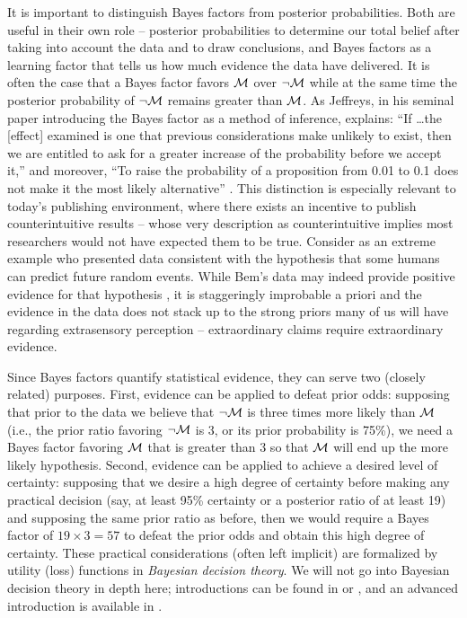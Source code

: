 It is important to distinguish Bayes factors from posterior probabilities. Both are useful in their own role -- posterior probabilities to determine our total belief after taking into account the data and to draw conclusions, and Bayes factors as a learning factor that tells us how much evidence the data have delivered. It is often the case that a Bayes factor favors ${\cal M}$ over $\neg{\cal M}$ while at the same time the posterior probability of $\neg{\cal M}$ remains greater than ${\cal M}$.  As Jeffreys, in his seminal paper introducing the Bayes factor as a method of inference, explains: ``If \dots  the [effect] examined is one that previous considerations make unlikely to exist, then we are entitled to ask for a greater increase of the probability before we accept it,'' and moreover, ``To raise the probability of a proposition from 0.01 to 0.1 does not make it the most likely alternative'' \cite[p.\ 221]{Jeffreys1935}. This distinction is especially relevant to today's publishing environment, where there exists an incentive to publish counterintuitive results -- whose very description as counterintuitive implies most researchers would not have expected them to be true. Consider as an extreme example  who presented data consistent with the hypothesis that some humans can predict future random events. While Bem's data may indeed provide positive evidence for that hypothesis \cite{RouderMorey2011}, it is staggeringly improbable a priori and the evidence in the data does not stack up to the strong priors many of us will have regarding extrasensory perception -- extraordinary claims require extraordinary evidence.

Since Bayes factors quantify statistical evidence, they can serve two (closely related) purposes. First, evidence can be applied to defeat prior odds: supposing that prior to the data we believe that $\neg{\cal M}$ is three times more likely than ${\cal M}$ (i.e., the prior ratio favoring $\neg{\cal M}$ is 3, or its prior probability is 75\%), we need a Bayes factor favoring ${\cal M}$ that is greater than 3 so that ${\cal M}$ will end up the more likely hypothesis. Second, evidence can be applied to achieve a desired level of certainty: supposing that we desire a high degree of certainty before making any practical decision (say, at least 95\% certainty or a posterior ratio of at least 19) and supposing the same prior ratio as before, then we would require a Bayes factor of $19 \times 3 = 57$ to defeat the prior odds and obtain this high degree of certainty. {These practical considerations (often left implicit) are formalized by utility (loss) functions in \textit{Bayesian decision theory}. We will not go into Bayesian decision theory in depth here; introductions can be found in  or , and an advanced introduction is available in .}

